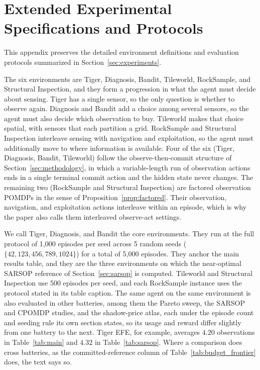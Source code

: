 \section{Extended Experimental Specifications and Protocols}
\label{app:experimental_protocol}

This appendix preserves the detailed environment definitions and evaluation protocols summarized in Section~\ref{sec:experiments}.

The six environments are Tiger, Diagnosis, Bandit, Tileworld, RockSample, and Structural Inspection, and they form a progression in what the agent must decide about sensing. Tiger has a single sensor, so the only question is whether to observe again. Diagnosis and Bandit add a choice among several sensors, so the agent must also decide which observation to buy. Tileworld makes that choice spatial, with sensors that each partition a grid. RockSample and Structural Inspection interleave sensing with navigation and exploitation, so the agent must additionally move to where information is available. Four of the six (Tiger, Diagnosis, Bandit, Tileworld) follow the observe-then-commit structure of Section~\ref{sec:methodology}, in which a variable-length run of observation actions ends in a single terminal commit action and the hidden state never changes. The remaining two (RockSample and Structural Inspection) are factored observation POMDPs in the sense of Proposition~\ref{prop:factored}. Their observation, navigation, and exploitation actions interleave within an episode, which is why the paper also calls them interleaved observe-act settings.

We call Tiger, Diagnosis, and Bandit the core environments. They run at the full protocol of 1{,}000 episodes per seed across 5 random seeds ($\{42, 123, 456, 789, 1024\}$) for a total of 5{,}000 episodes. They anchor the main results table, and they are the three environments on which the near-optimal SARSOP reference of Section~\ref{sec:sarsop} is computed. Tileworld and Structural Inspection use 500 episodes per seed, and each RockSample instance uses the protocol stated in its table caption. The same agent on the same environment is also evaluated in other batteries, among them the Pareto sweep, the SARSOP and CPOMDP studies, and the shadow-price atlas, each under the episode count and seeding rule its own section states, so its usage and reward differ slightly from one battery to the next. Tiger EFE, for example, averages $4.20$ observations in Table~\ref{tab:main} and $4.32$ in Table~\ref{tab:sarsop}. Where a comparison does cross batteries, as the committed-reference column of Table~\ref{tab:budget_frontier} does, the text says so.

